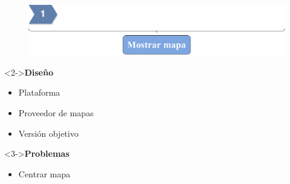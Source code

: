 \begin{slide}
  \begin{center}
    \begin{figure}[!h]
      \includegraphics[height=0.27\textheight]{img/ite1.png}
    \end{figure}
    \vspace{0.5cm}
    \begin{minipage}[b]{0.4\linewidth}
      \begin{block}<2->{\textbf{Diseño}}
        \begin{itemize}
          \item Plataforma
          \item Proveedor de mapas
          \item Versión objetivo
        \end{itemize}
      \end{block}
    \end{minipage}
    \hspace{0.5cm}
    \begin{minipage}[b]{0.4\linewidth}
      \begin{block}<3->{\textbf{Problemas}}
        \begin{itemize}
          \item Centrar mapa
        \end{itemize}
      \end{block}
    \end{minipage}
  \end{center}
\end{slide}

